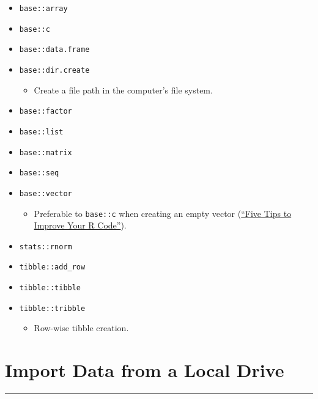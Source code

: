 \documentclass[
]{book}
\providecommand{\tightlist}{%
  \setlength{\itemsep}{0pt}\setlength{\parskip}{0pt}}
\begin{document}
\begin{itemize}
\tightlist
\item
  \texttt{base::array}
\item
  \texttt{base::c}
\item
  \texttt{base::data.frame}
\item
  \texttt{base::dir.create}

  \begin{itemize}
  \tightlist
  \item
    Create a file path in the computer's file system.
  \end{itemize}
\item
  \texttt{base::factor}
\item
  \texttt{base::list}
\item
  \texttt{base::matrix}
\item
  \texttt{base::seq}
\item
  \texttt{base::vector}

  \begin{itemize}
  \tightlist
  \item
    Preferable to \texttt{base::c} when creating an empty vector (\href{https://www.datacamp.com/community/tutorials/five-tips-r-code-improve}{``Five Tips to Improve Your R Code''}).
  \end{itemize}
\item
  \texttt{stats::rnorm}
\item
  \texttt{tibble::add\_row}
\item
  \texttt{tibble::tibble}
\item
  \texttt{tibble::tribble}

  \begin{itemize}
  \tightlist
  \item
    Row-wise tibble creation.
  \end{itemize}
\end{itemize}

\hypertarget{import-data-from-a-local-drive}{%
\section{Import Data from a Local Drive}\label{import-data-from-a-local-drive}}

\begin{center}\rule{0.5\linewidth}{0.5pt}\end{center}
\end{document}
